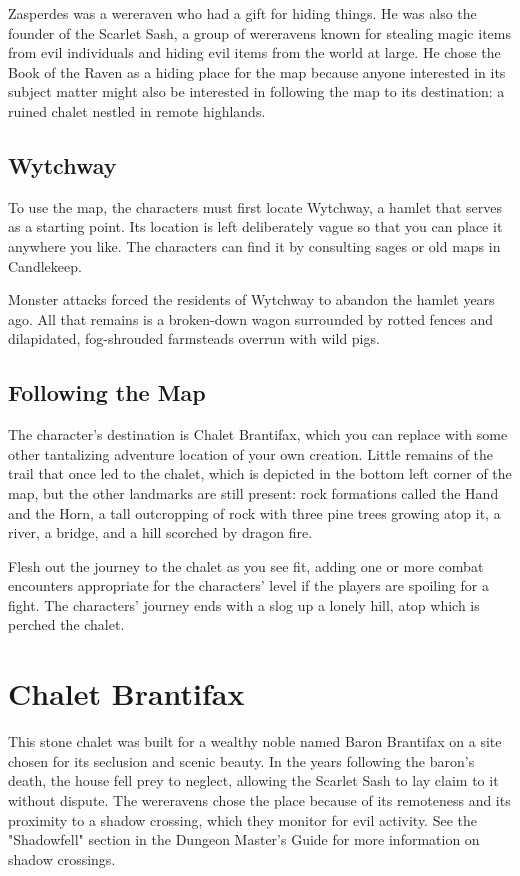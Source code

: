 \documentclass[10pt,a4paper,twoside,bg=print,twocolumn,openany,nodeprecatedcode]{dndbook}
\begin{document}
Zasperdes was a wereraven who had a gift for hiding things. He was also the founder of the Scarlet Sash, a group of wereravens known for stealing magic items from evil individuals and hiding evil items from the world at large. He chose the Book of the Raven as a hiding place for the map because anyone interested in its subject matter might also be interested in following the map to its destination: a ruined chalet nestled in remote highlands.

\subsection{Wytchway}
To use the map, the characters must first locate Wytchway, a hamlet that serves as a starting point. Its location is left deliberately vague so that you can place it anywhere you like. The characters can find it by consulting sages or old maps in Candlekeep.

Monster attacks forced the residents of Wytchway to abandon the hamlet years ago. All that remains is a broken-down wagon surrounded by rotted fences and dilapidated, fog-shrouded farmsteads overrun with wild pigs.

\subsection{Following the Map}
The character's destination is Chalet Brantifax, which you can replace with some other tantalizing adventure location of your own creation. Little remains of the trail that once led to the chalet, which is depicted in the bottom left corner of the map, but the other landmarks are still present: rock formations called the Hand and the Horn, a tall outcropping of rock with three pine trees growing atop it, a river, a bridge, and a hill scorched by dragon fire.

Flesh out the journey to the chalet as you see fit, adding one or more combat encounters appropriate for the characters' level if the players are spoiling for a fight. The characters' journey ends with a slog up a lonely hill, atop which is perched the chalet.

\section{Chalet Brantifax}
This stone chalet was built for a wealthy noble named Baron Brantifax on a site chosen for its seclusion and scenic beauty. In the years following the baron's death, the house fell prey to neglect, allowing the Scarlet Sash to lay claim to it without dispute. The wereravens chose the place because of its remoteness and its proximity to a shadow crossing, which they monitor for evil activity. See the "Shadowfell" section in the Dungeon Master's Guide for more information on shadow crossings.
\end{document}
